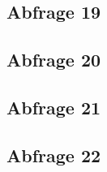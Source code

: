 \subsection*{Abfrage 19}

\subsection*{Abfrage 20}

\subsection*{Abfrage 21}

\subsection*{Abfrage 22}



